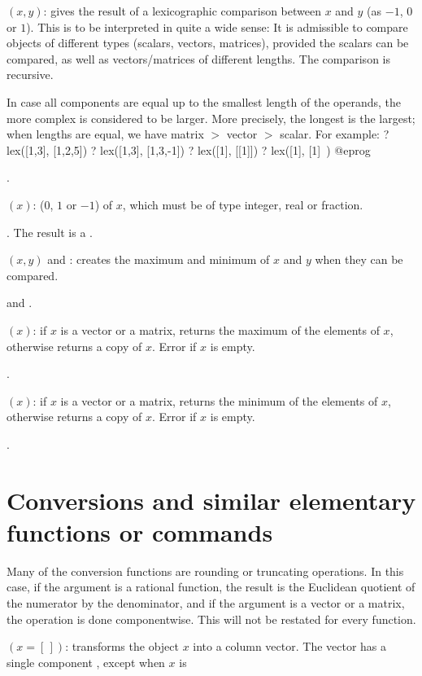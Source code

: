 $(x,y)$: gives the result of a lexicographic comparison
between $x$ and $y$ (as $-1$, $0$ or $1$). This is to be interpreted in quite
a wide sense: It is admissible to compare objects of different types
(scalars, vectors, matrices), provided the scalars can be compared, as well
as vectors/matrices of different lengths. The comparison is recursive.

In case all components are equal up to the smallest length of the operands,
the more complex is considered to be larger. More precisely, the longest is
the largest; when lengths are equal, we have matrix $>$ vector $>$ scalar.
For example:
\bprog
? lex([1,3], [1,2,5])
? lex([1,3], [1,3,-1])
? lex([1], [[1]])
? lex([1], [1]~)
@eprog

.

$(x)$:  ($0$, $1$ or $-1$) of $x$, which must be of
type integer, real or fraction.

. The result is a .

$(x,y)$ and : creates the
maximum and minimum of $x$ and $y$ when they can be compared.

 and .

$(x)$: if $x$ is a vector or a matrix, returns the maximum
of the elements of $x$, otherwise returns a copy of $x$. Error if $x$ is
empty.

.

$(x)$: if $x$ is a vector or a matrix, returns the minimum
of the elements of $x$, otherwise returns a copy of $x$. Error if $x$ is
empty.

.

\section{Conversions and similar elementary functions or commands}
\label{se:conversion}

\noindent
Many of the conversion functions are rounding or truncating operations. In
this case, if the argument is a rational function, the result is the
Euclidean quotient of the numerator by the denominator, and if the argument
is a vector or a matrix, the operation is done componentwise. This will not
be restated for every function.

$({x=[\,]})$: transforms the object $x$ into a column vector.
The vector has a single component , except when $x$ is

